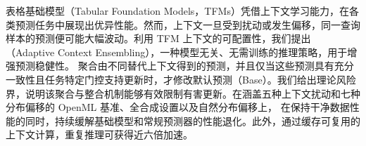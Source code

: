 表格基础模型（Tabular Foundation Models，TFMs）凭借上下文学习能力，在各类预测任务中展现出优异性能。然而，上下文一旦受到扰动或发生偏移，同一查询样本的预测便可能大幅波动。利用 TFM 上下文的可配置性，我们提出 \textbf{\method{}}（Adaptive Context Ensembling），一种模型无关、无需训练的推理策略，用于增强预测稳健性。\method{} 聚合由不同替代上下文得到的预测，并且仅当这些预测具有充分一致性且任务特定门控支持更新时，才修改默认预测（Base）。我们给出理论风险界，说明该聚合与整合机制能够有效限制有害更新。在涵盖五种上下文扰动和七种分布偏移的 OpenML 基准、全合成设置以及自然分布偏移上，\method{} 在保持干净数据性能的同时，持续缓解基础模型和常规预测器的性能退化。此外，通过缓存可复用的上下文计算，重复推理可获得近六倍加速。
